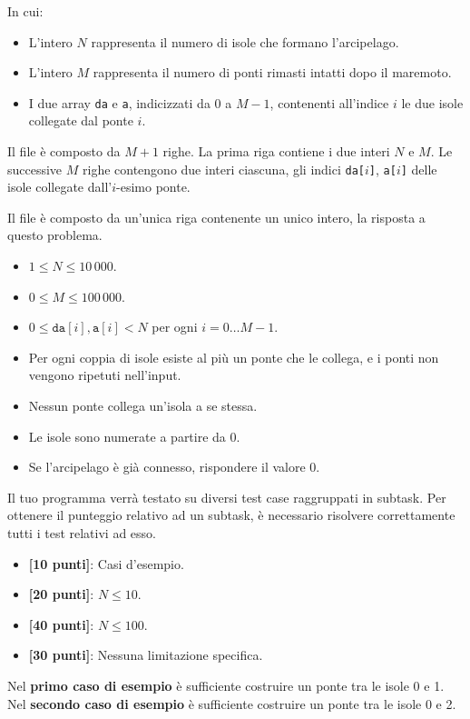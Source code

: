 In cui:
\begin{itemize}[nolistsep]
  \item L'intero $N$ rappresenta il numero di isole che formano l'arcipelago.
  \item L'intero $M$ rappresenta il numero di ponti rimasti intatti dopo il maremoto.
  \item I due array \texttt{da} e \texttt{a}, indicizzati da $0$ a $M-1$, contenenti all'indice $i$ le due isole collegate dal ponte $i$.
\end{itemize}

\InputFile
Il file  è composto da $M+1$ righe. La prima riga contiene i due interi $N$ e $M$. Le successive $M$ righe contengono due interi ciascuna, gli indici \texttt{da[$i$]}, \texttt{a[$i$]} delle isole collegate dall'$i$-esimo ponte.

\OutputFile
Il file \outputfile{} è composto da un'unica riga contenente un unico intero, la risposta a questo problema.

\Constraints
\begin{itemize}[nolistsep, itemsep=2mm]
	\item $1 \le N \le 10\,000$.
	\item $0 \le M \le 100\,000$.
	\item $0 \le \texttt{da}[i], \texttt{a}[i] < N$ per ogni $i=0\ldots M-1$.
	\item Per ogni coppia di isole esiste al più un ponte che le collega, e i ponti non vengono ripetuti nell'input.
	\item Nessun ponte collega un'isola a se stessa.
	\item Le isole sono numerate a partire da 0.
	\item Se l'arcipelago è già connesso, rispondere il valore 0.
\end{itemize}

\Scoring
Il tuo programma verrà testato su diversi test case raggruppati in subtask.
Per ottenere il punteggio relativo ad un subtask, è necessario risolvere
correttamente tutti i test relativi ad esso.

\begin{itemize}[nolistsep,itemsep=2mm]
  \item \textbf{ [10 punti]}: Casi d'esempio.
  \item \textbf{ [20 punti]}: $N \leq 10$.
  \item \textbf{ [40 punti]}: $N \leq 100$.
  \item \textbf{ [30 punti]}: Nessuna limitazione specifica.
\end{itemize}

\Examples
\begin{example}
%
%
\end{example}


\Explanation
Nel \textbf{primo caso di esempio} è sufficiente costruire un ponte tra le isole 0 e 1.\\[2mm]
Nel \textbf{secondo caso di esempio} è sufficiente costruire un ponte tra le isole 0 e 2.
